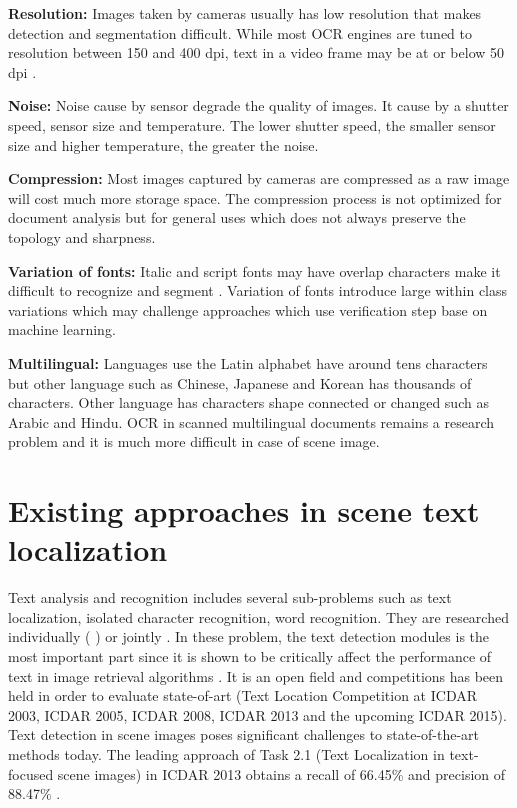 \textbf{Resolution:} Images taken by cameras usually has low resolution that makes detection and segmentation difficult. While most OCR engines are tuned to resolution between 150 and 400 dpi, text in a video frame may be at or below 50 dpi \cite{Liang.2005.IJDAR}.

\textbf{Noise: } Noise cause by sensor degrade the quality of images. It cause by a shutter speed, sensor size and temperature. The lower shutter speed, the smaller sensor size and higher temperature, the greater the noise. 

\textbf{Compression: } Most images captured by cameras are compressed as a raw image will cost much more storage space. The compression process is not optimized for document analysis but for general uses which does not always preserve the topology and sharpness.

\textbf{Variation of fonts: } Italic and script fonts may have overlap characters make it difficult to recognize and segment \cite{Liu.2011.ICDAR}. Variation of fonts introduce large within class variations which may challenge approaches which use verification step base on machine learning.

\textbf{Multilingual: } Languages use the Latin alphabet have around tens characters but other language such as Chinese, Japanese and Korean has thousands of characters. Other language has characters shape connected or changed such as Arabic and Hindu. OCR in scanned multilingual documents remains a research problem \cite{Smith.2009.IWMO} and it is much more difficult in case of scene image.


\section{Existing approaches in scene text localization}
Text analysis and recognition includes several sub-problems such as text localization, isolated character recognition, word recognition. They are researched individually (\cite{Campos.2010.CVPR} \cite{Chen.2004.CVPR} \cite{Liu.2006.CRA} \cite{Epshtein.2010.CVPR} \cite{xucheng.2013.pami}) or jointly \cite{Neumann12}. In these problem, the text detection modules is the most important part since it is shown to be critically affect the performance of text in image retrieval algorithms \cite{Epshtein.2010.CVPR}. It is an open field and competitions has been held in order to evaluate state-of-art (Text Location Competition at ICDAR 2003, ICDAR 2005, ICDAR 2008, ICDAR 2013 and the upcoming ICDAR 2015). Text detection in scene images  poses significant challenges to state-of-the-art methods today. The leading approach of Task 2.1 (Text Localization in text-focused scene images) in ICDAR 2013 obtains a recall of 66.45\% and precision of 88.47\% \cite{ICDAR.2013}. 


